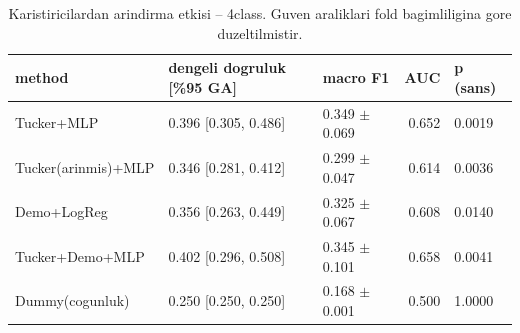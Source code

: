 \begin{table}[htbp]
  \centering
  \caption{Karistiricilardan arindirma etkisi -- 4class. Guven araliklari fold bagimliligina gore duzeltilmistir.}
  \label{tab:deconf_4class}
  \small
  \begin{tabular}{lllrl}
    \toprule
    method & dengeli dogruluk [\%95 GA] & macro F1 & AUC & p (sans) \\
    \midrule
    Tucker+MLP & 0.396 [0.305, 0.486] & 0.349 $\pm$ 0.069 & 0.652 & 0.0019 \\
    Tucker(arinmis)+MLP & 0.346 [0.281, 0.412] & 0.299 $\pm$ 0.047 & 0.614 & 0.0036 \\
    Demo+LogReg & 0.356 [0.263, 0.449] & 0.325 $\pm$ 0.067 & 0.608 & 0.0140 \\
    Tucker+Demo+MLP & 0.402 [0.296, 0.508] & 0.345 $\pm$ 0.101 & 0.658 & 0.0041 \\
    Dummy(cogunluk) & 0.250 [0.250, 0.250] & 0.168 $\pm$ 0.001 & 0.500 & 1.0000 \\
    \bottomrule
  \end{tabular}
\end{table}

